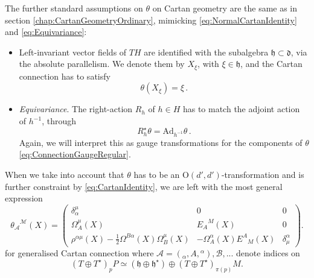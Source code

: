 \documentclass[11pt,a4paper]{article}
\numberwithin{equation}{section}
\begin{document}
\begin{enumerate}
    The further standard assumptions on $\theta$ on Cartan geometry are the same as in section \ref{chap:CartanGeometryOrdinary}, mimicking \eqref{eq:NormalCartanIdentity} and \eqref{eq:Equivariance}:
 \begin{itemize}
        \item Left-invariant vector fields of $TH$ are identified with the subalgebra $\mathfrak{h} \subset \mathfrak{d}$, via the absolute parallelism. We denote them by $X_\xi$, with $\xi\in\mathfrak{h}$, and the Cartan connection has to satisfy
          \begin{equation}\label{eq:CartanIdentity}
            \theta(X_\xi) = \xi\,.
          \end{equation}
        \item \textit{Equivariance}. The right-action $R_h$ of $h \in H$ has to match the adjoint action of $h^{-1}$, through
        \begin{equation}
            R^\star_h \theta = \mathrm{Ad}_{h^{-1}} \theta\,. \label{eq:EquivarianceGeneralised}
        \end{equation}
        Again, we will interpret this as gauge transformations for the components of $\theta$ \eqref{eq:ConnectionGaugeRegular}.
    \end{itemize}
    When we take into account that $\theta$ has to be an O$(d',d')$-transformation and is further constraint by \eqref{eq:CartanIdentity}, we are left with the most general expression
    \begin{equation} 
	{\theta_\mathcal{A}}^{\mathcal{M}}(X) = \left( \begin{array}{ccc} \delta_\alpha^\mu & 0 & 0 \\ \Omega_A^\mu(X) & {E_A}^M(X) & 0 \\ \rho^{\alpha \mu}(X) - \frac{1}{2} \Omega^{B\alpha}(X) \Omega_B^\mu(X) & - \Omega^{\alpha}_A(X) {E^A}_M(X) & \delta^\alpha_\mu
	\end{array} \right) . \label{eq:GeneralisedCartanConnectionChoice}
\end{equation}
    for generalised Cartan connection where $\mathcal{A}=({}_\alpha,A,{}^\alpha),\mathcal{B},...$ denote indices on 
    \begin{equation}
    (T \oplus T^\star)_p P \simeq (\mathfrak{h} \oplus \mathfrak{h}^\star) \oplus (T \oplus T^\star)_{\pi(p)} M .
    \end{equation}

\end{enumerate}
\end{document}
